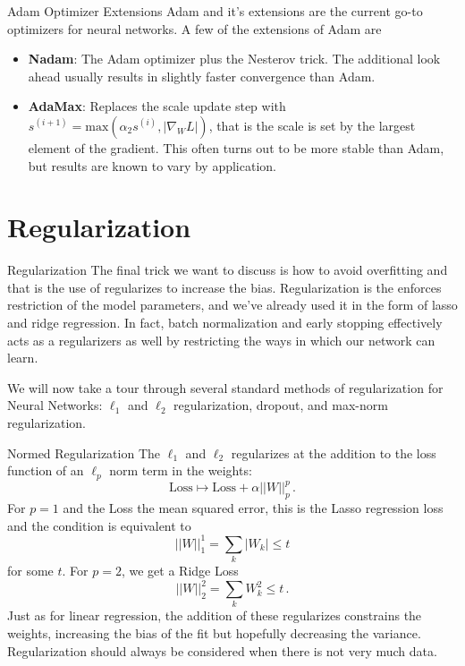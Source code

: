 \documentclass[10pt, table, dvipsnames,xcdraw,handout]{beamer}
\begin{document}
\begin{frame}[fragile]{Adam Optimizer Extensions}
Adam and it's extensions are the current go-to optimizers for neural networks. A few of the extensions of Adam are
\begin{itemize}
\item \textbf{Nadam}: The Adam optimizer plus the Nesterov trick. The additional look ahead usually results in slightly faster convergence than Adam. \pause
\item \textbf{AdaMax}: Replaces the scale update step with $s^{(i+1)} = \text{max}(\alpha_2 s^{(i)},| \nabla_{W} L|)$, that is the scale is set by the largest element of the gradient. This often turns out to be more stable than Adam, but results are known to vary by application. 
\end{itemize}
\end{frame}






\section{Regularization}

\begin{frame}[fragile]{Regularization}
The final trick we want to discuss is how to avoid overfitting and that is the use of regularizes to increase the bias. Regularization is the enforces restriction of the model parameters, and we've already used it in the form of lasso and ridge regression. In fact, batch normalization and early stopping effectively acts as a regularizers as well by restricting the ways in which our network can learn. 

We will now take a tour through several standard methods of regularization for Neural Networks: $\ell_1$ and $\ell_2$ regularization, dropout, and max-norm regularization. 
\end{frame}




\begin{frame}[fragile]{Normed Regularization}
The $\ell_1$ and $\ell_2$ regularizes at the addition to the loss function of an $\ell_p$ norm term in the weights:
$$
\text{Loss} \mapsto \text{Loss} + \alpha ||W||_p^p\,.
$$
For $p=1$ and the Loss the mean squared error, this is the Lasso regression loss and the condition is equivalent to 
$$
||W||_1^1  = \sum_k |W_k| \leq t
$$
for some $t$. \pause For $p=2$, we get a Ridge Loss
$$
||W||_2^2 = \sum_k W_k^2 \leq t\,.
$$\pause
Just as for linear regression, the addition of these regularizes constrains the weights, increasing the bias of the fit but hopefully decreasing the variance. Regularization should always be considered when there is not very much data. 
\end{frame}
\end{document}
